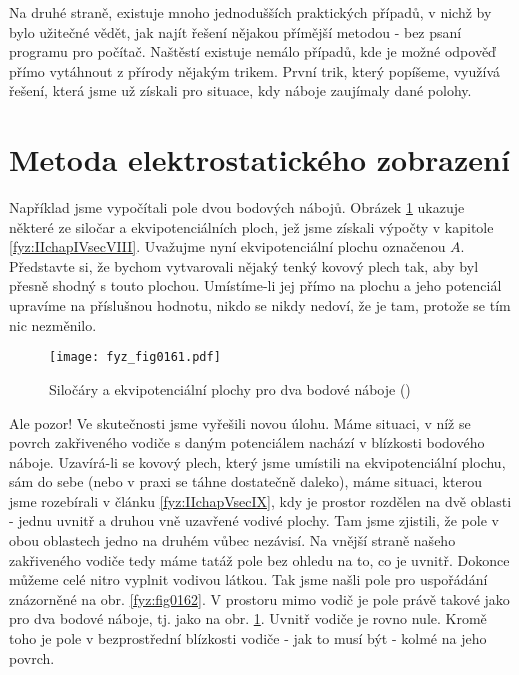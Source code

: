   Na druhé straně, existuje mnoho jednodušších praktických případů, v nichž by bylo užitečné vědět,
  jak najít řešení nějakou přímější metodou - bez psaní programu pro počítač. Naštěstí existuje
  nemálo případů, kde je možné odpověď přímo vytáhnout z přírody nějakým trikem. První trik, který
  popíšeme, využívá řešení, která jsme už získali pro situace, kdy náboje zaujímaly dané polohy.
  
\section{Metoda elektrostatického zobrazení}\label{fyz:IIchapVsecXVI}
  Například jsme vypočítali pole dvou bodových nábojů. Obrázek \ref{fyz:fig0161} ukazuje některé ze
  siločar a ekvipotenciálních ploch, jež jsme získali výpočty v kapitole \ref{fyz:IIchapIVsecVIII}.
  Uvažujme nyní ekvipotenciální plochu označenou \(A\). Představte si, že bychom vytvarovali nějaký
  tenký kovový plech tak, aby byl přesně shodný s touto plochou. Umístíme-li jej přímo na plochu a
  jeho potenciál upravíme na příslušnou hodnotu, nikdo se nikdy nedoví, že je tam, protože se tím
  nic nezměnilo.

  \begin{figure}[ht!]  %
    \centering
    \texttt{[image: fyz\_fig0161.pdf]}
    \caption{Siločáry a ekvipotenciální plochy pro dva bodové náboje
             (\cite[s.~110]{Feynman02})}
    \label{fyz:fig0161}
  \end{figure}
    
  Ale pozor! Ve skutečnosti jsme vyřešili novou úlohu. Máme situaci, v níž se povrch zakřiveného
  vodiče s daným potenciálem nachází v blízkosti bodového náboje. Uzavírá-li se kovový plech, který
  jsme umístili na ekvipotenciální plochu, sám do sebe (nebo v praxi se táhne dostatečně daleko),
  máme situaci, kterou jsme rozebírali v článku \ref{fyz:IIchapVsecIX}, kdy je prostor rozdělen na
  dvě oblasti - jednu uvnitř a druhou vně uzavřené vodivé plochy. Tam jsme zjistili, že pole v obou
  oblastech jedno na druhém vůbec nezávisí. Na vnější straně našeho zakřiveného vodiče tedy máme
  tatáž pole bez ohledu na to, co je uvnitř. Dokonce můžeme celé nitro vyplnit vodivou látkou. Tak
  jsme našli pole pro uspořádání znázorněné na obr. \ref{fyz:fig0162}. V prostoru mimo vodič je pole
  právě takové jako pro dva bodové náboje, tj. jako na obr. \ref{fyz:fig0161}. Uvnitř vodiče je rovno
  nule. Kromě toho je pole v bezprostřední blízkosti vodiče - jak to musí být - kolmé na jeho
  povrch.
  
